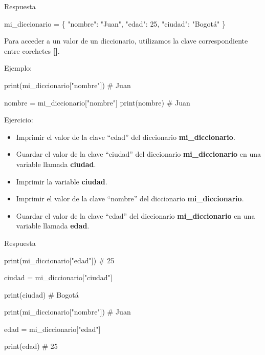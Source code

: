 \documentclass[
  a4paper,
  DIV=11,
  numbers=noendperiod,
  onepage,
  openany]{scrreprt}
\newenvironment{Shaded}{\begin{snugshade}}{\end{snugshade}}
\newcommand{\BuiltInTok}[1]{\textcolor[rgb]{0.00,0.23,0.31}{#1}}
\newcommand{\CommentTok}[1]{\textcolor[rgb]{0.37,0.37,0.37}{#1}}
\newcommand{\DecValTok}[1]{\textcolor[rgb]{0.68,0.00,0.00}{#1}}
\newcommand{\NormalTok}[1]{\textcolor[rgb]{0.00,0.23,0.31}{#1}}
\newcommand{\OperatorTok}[1]{\textcolor[rgb]{0.37,0.37,0.37}{#1}}
\newcommand{\StringTok}[1]{\textcolor[rgb]{0.13,0.47,0.30}{#1}}
\providecommand{\tightlist}{%
  \setlength{\itemsep}{0pt}\setlength{\parskip}{0pt}}\usepackage{longtable,booktabs,array}
\begin{document}
Respuesta

\begin{Shaded}
\begin{Highlighting}[]
\NormalTok{mi\_diccionario }\OperatorTok{=}\NormalTok{ \{}
    \StringTok{"nombre"}\NormalTok{: }\StringTok{"Juan"}\NormalTok{,}
    \StringTok{"edad"}\NormalTok{: }\DecValTok{25}\NormalTok{,}
    \StringTok{"ciudad"}\NormalTok{: }\StringTok{"Bogotá"}
\NormalTok{\}}
\end{Highlighting}
\end{Shaded}

Para acceder a un valor de un diccionario, utilizamos la clave
correspondiente entre corchetes \textbf{{[}{]}}.

Ejemplo:

\begin{Shaded}
\begin{Highlighting}[]
\BuiltInTok{print}\NormalTok{(mi\_diccionario[}\StringTok{"nombre"}\NormalTok{])  }\CommentTok{\# Juan}

\NormalTok{nombre }\OperatorTok{=}\NormalTok{ mi\_diccionario[}\StringTok{"nombre"}\NormalTok{]}
\BuiltInTok{print}\NormalTok{(nombre)  }\CommentTok{\# Juan}
\end{Highlighting}
\end{Shaded}

Ejercicio:

\begin{itemize}
\tightlist
\item
  Imprimir el valor de la clave ``edad'' del diccionario
  \textbf{mi\_diccionario}.
\item
  Guardar el valor de la clave ``ciudad'' del diccionario
  \textbf{mi\_diccionario} en una variable llamada \textbf{ciudad}.
\item
  Imprimir la variable \textbf{ciudad}.
\item
  Imprimir el valor de la clave ``nombre'' del diccionario
  \textbf{mi\_diccionario}.
\item
  Guardar el valor de la clave ``edad'' del diccionario
  \textbf{mi\_diccionario} en una variable llamada \textbf{edad}.
\end{itemize}

Respuesta

\begin{Shaded}
\begin{Highlighting}[]
\BuiltInTok{print}\NormalTok{(mi\_diccionario[}\StringTok{"edad"}\NormalTok{])  }\CommentTok{\# 25}

\NormalTok{ciudad }\OperatorTok{=}\NormalTok{ mi\_diccionario[}\StringTok{"ciudad"}\NormalTok{]}

\BuiltInTok{print}\NormalTok{(ciudad)  }\CommentTok{\# Bogotá}

\BuiltInTok{print}\NormalTok{(mi\_diccionario[}\StringTok{"nombre"}\NormalTok{])  }\CommentTok{\# Juan}

\NormalTok{edad }\OperatorTok{=}\NormalTok{ mi\_diccionario[}\StringTok{"edad"}\NormalTok{]}

\BuiltInTok{print}\NormalTok{(edad)  }\CommentTok{\# 25}
\end{Highlighting}
\end{Shaded}
\end{document}
